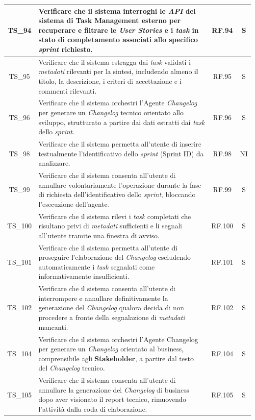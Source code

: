 \documentclass[12pt, a4paper]{article}
\newlength{\LargColVal} %
\begin{document}
\begin{xltabular}{\textwidth}{|c|X|C{\LargColVal}|C{\LargColVal}|}
    TS\_94 & Verificare che il sistema interroghi le \textit{API} del sistema di Task Management esterno per recuperare e filtrare le \textit{User Stories} e i \textit{task} in stato di completamento associati allo specifico \textit{sprint} richiesto. & RF.94 & S \\ \hline
    TS\_95 & Verificare che il sistema estragga dai \textit{task} validati i \textit{metadati} rilevanti per la sintesi, includendo almeno il titolo, la descrizione, i criteri di accettazione e i commenti rilevanti. & RF.95 & S \\ \hline
    TS\_96 & Verificare che il sistema orchestri l'Agente \textit{Changelog} per generare un \textit{Changelog} tecnico orientato allo sviluppo, strutturato a partire dai dati estratti dai \textit{task} dello \textit{sprint}. & RF.96 & S \\ \hline
    TS\_98 & Verificare che il sistema permetta all'utente di inserire testualmente l'identificativo dello \textit{sprint} (Sprint ID) da analizzare. & RF.98 & NI \\ \hline
    TS\_99 & Verificare che il sistema consenta all'utente di annullare volontariamente l'operazione durante la fase di richiesta dell'identificativo dello \textit{sprint}, bloccando l'esecuzione dell'agente. & RF.99 & S \\ \hline
    TS\_100 & Verificare che il sistema rilevi i \textit{task} completati che risultano privi di \textit{metadati} sufficienti e li segnali all'utente tramite una finestra di avviso. & RF.100 & S \\ \hline
    TS\_101 & Verificare che il sistema permetta all'utente di proseguire l'elaborazione del \textit{Changelog} escludendo automaticamente i \textit{task} segnalati come informativamente insufficienti. & RF.101 & S \\ \hline
    TS\_102 & Verificare che il sistema consenta all'utente di interrompere e annullare definitivamente la generazione del \textit{Changelog} qualora decida di non procedere a fronte della segnalazione di \textit{metadati} mancanti. & RF.102 & S \\ \hline
    TS\_104 & Verificare che il sistema orchestri l'Agente Changelog per generare un \textit{Changelog} orientato al business, comprensibile agli \textbf{Stakeholder}, a partire dal testo del \textit{Changelog} tecnico. & RF.104 & S \\ \hline
    TS\_105 & Verificare che il sistema consenta all'utente di annullare la generazione del \textit{Changelog} di business dopo aver visionato il report tecnico, rimuovendo l'attività dalla coda di elaborazione. & RF.105 & S \\ \hline

\end{xltabular}
\end{document}
